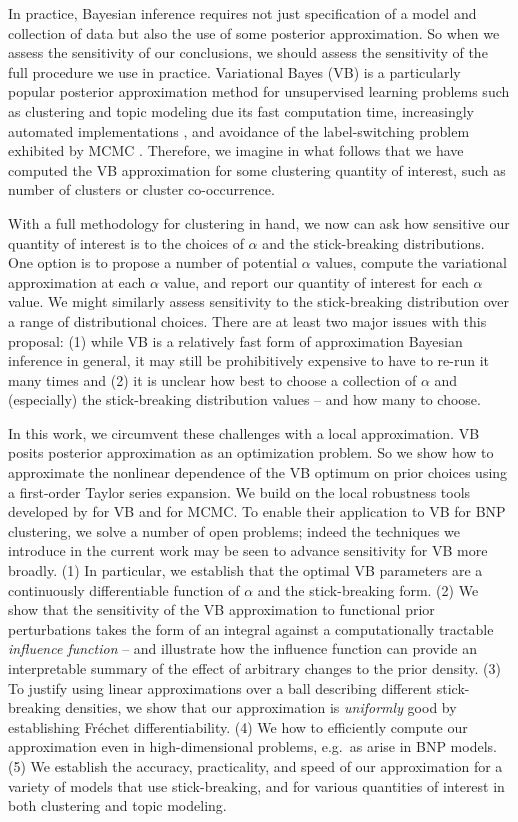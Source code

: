 In practice, Bayesian inference requires not just specification of a model and
collection of data but also the use of some posterior approximation. So when we
assess the sensitivity of our conclusions, we should assess the sensitivity of
the full procedure we use in practice. Variational Bayes (VB) is a particularly
popular posterior approximation method for unsupervised learning problems such
as clustering and topic modeling due its fast computation time, increasingly
automated implementations \citep{ranganath:2013:black, kucukelbir:2016:advi},
and avoidance of the label-switching problem exhibited by MCMC
\citep{jasra:2005:mcmclabelswitch}. Therefore, we imagine in what follows that
we have computed the VB approximation for some clustering quantity of interest,
such as number of clusters or cluster co-occurrence.

With a full methodology for clustering in hand, we now can ask how sensitive our
quantity of interest is to the choices of $\alpha$ and the stick-breaking
distributions. One option is to propose a number of potential $\alpha$ values,
compute the variational approximation at each $\alpha$ value, and report our
quantity of interest for each $\alpha$ value. We might similarly assess
sensitivity to the stick-breaking distribution over a range of distributional
choices. There are at least two major issues with this proposal: (1) while VB is
a relatively fast form of approximation Bayesian inference in general, it may
still be prohibitively expensive to have to re-run it many times and (2) it is
unclear how best to choose a collection of $\alpha$ and (especially) the
stick-breaking distribution values -- and how many to choose.

In this work, we circumvent these challenges with a local approximation. VB
posits posterior approximation as an optimization problem. So we show how to
approximate the nonlinear dependence of the VB optimum on prior choices using a
first-order Taylor series expansion. We build on the local robustness tools
developed by \cite{giordano:2018:covariances} for VB and
\cite{gustafson:1996:local} for MCMC. To enable their application to VB for BNP
clustering, we solve a number of open problems; indeed the techniques we
introduce in the current work may be seen to advance sensitivity for VB more
broadly. (1) In particular, we establish that the optimal VB parameters are a
continuously differentiable function of $\alpha$ and the stick-breaking form.
(2) We show that the sensitivity of the VB approximation to functional prior
perturbations takes the form of an integral against a computationally tractable
\textit{influence function} -- and illustrate how the influence function can
provide an interpretable summary of the effect of arbitrary changes to the prior
density. (3) To justify using linear approximations over a ball describing
different stick-breaking densities, we show that our approximation is
\textit{uniformly} good by establishing Fr\'echet differentiability. (4) We how
to efficiently compute our approximation even in high-dimensional problems,
e.g.\ as arise in BNP models. (5) We establish the accuracy, practicality, and
speed of our approximation for a variety of models that use stick-breaking, and
for various quantities of interest in both clustering and topic modeling.
